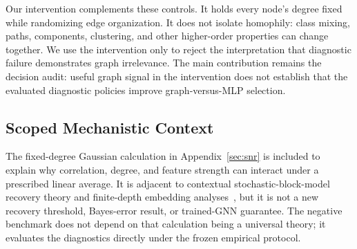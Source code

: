 Our intervention complements these controls. It holds every node's degree fixed while randomizing edge organization. It does not isolate homophily: class mixing, paths, components, clustering, and other higher-order properties can change together. We use the intervention only to reject the interpretation that diagnostic failure demonstrates graph irrelevance. The main contribution remains the decision audit: useful graph signal in the intervention does not establish that the evaluated diagnostic policies improve graph-versus-MLP selection.

\subsection{Scoped Mechanistic Context}

The fixed-degree Gaussian calculation in Appendix~\ref{sec:snr} is included to explain why correlation, degree, and feature strength can interact under a prescribed linear average. It is adjacent to contextual stochastic-block-model recovery theory and finite-depth embedding analyses~\citep{lu2023contextual,pmlr-v269-dalle25a}, but it is not a new recovery threshold, Bayes-error result, or trained-GNN guarantee. The negative benchmark does not depend on that calculation being a universal theory; it evaluates the diagnostics directly under the frozen empirical protocol.
